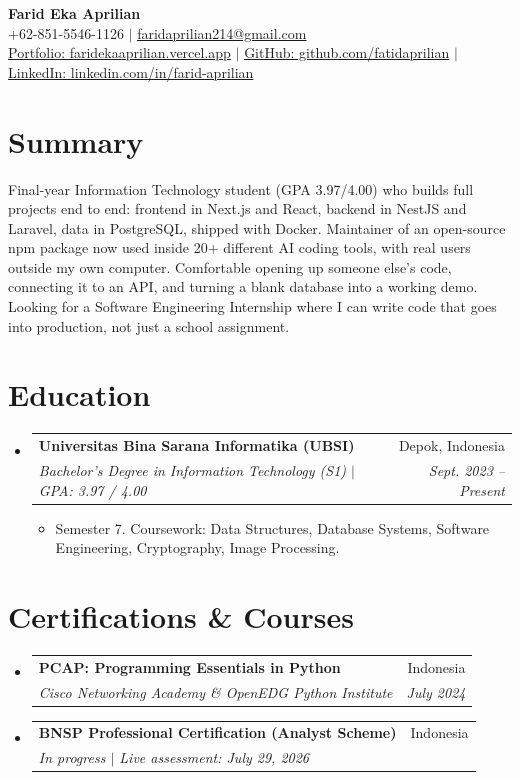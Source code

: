 \documentclass[letterpaper,11pt]{article}
\makeatletter
\newcommand{\resumeItem}[1]{
  \item\small{
    {#1 \vspace{-2pt}}
  }
}
\newcommand{\resumeSubheading}[4]{
  \vspace{-2pt}\item
    \begin{tabular*}{0.97\textwidth}[t]{l@{\extracolsep{\fill}}r}
      \textbf{#1} & #2 \\
      \textit{\small#3} & \textit{\small #4} \\
    \end{tabular*}\vspace{-5pt}
}
\newcommand{\resumeSubHeadingListStart}{\begin{itemize}[leftmargin=0.15in, label={}]}
\newcommand{\resumeSubHeadingListEnd}{\end{itemize}}
\newcommand{\resumeItemListStart}{\begin{itemize}[itemsep=0pt, topsep=0pt, parsep=2pt]}
\newcommand{\resumeItemListEnd}{\end{itemize}\vspace{1pt}}
\makeatother
\begin{document}
\begin{center}
    \textbf{\Huge Farid Eka Aprilian} \\ \vspace{4pt}
    \small +62-851-5546-1126 $|$ \href{mailto:faridaprilian214@gmail.com}{faridaprilian214@gmail.com} \\ \vspace{2pt}
    \href{https://faridekaaprilian.vercel.app/}{Portfolio: faridekaaprilian.vercel.app} $|$
    \href{https://github.com/fatidaprilian}{GitHub: github.com/fatidaprilian} $|$
    \href{https://www.linkedin.com/in/farid-aprilian/}{LinkedIn: linkedin.com/in/farid-aprilian}
\end{center}

\section{Summary}
  \small{Final-year Information Technology student (GPA 3.97/4.00) who builds full projects end to end: frontend in Next.js and React, backend in NestJS and Laravel, data in PostgreSQL, shipped with Docker. Maintainer of an open-source npm package now used inside 20+ different AI coding tools, with real users outside my own computer. Comfortable opening up someone else's code, connecting it to an API, and turning a blank database into a working demo. Looking for a Software Engineering Internship where I can write code that goes into production, not just a school assignment.}

\section{Education}
  \resumeSubHeadingListStart
    \resumeSubheading
      {Universitas Bina Sarana Informatika (UBSI)}{Depok, Indonesia}
      {Bachelor's Degree in Information Technology (S1) $|$ GPA: 3.97 / 4.00}{Sept. 2023 -- Present}
      \resumeItemListStart
        \resumeItem{Semester 7. Coursework: Data Structures, Database Systems, Software Engineering, Cryptography, Image Processing.}
      \resumeItemListEnd
  \resumeSubHeadingListEnd

\section{Certifications \& Courses}
  \resumeSubHeadingListStart
    \resumeSubheading
      {PCAP: Programming Essentials in Python}{Indonesia}
      {Cisco Networking Academy \& OpenEDG Python Institute}{July 2024}
    \resumeSubheading
      {BNSP Professional Certification (Analyst Scheme)}{Indonesia}
      {In progress $|$ Live assessment: July 29, 2026}{}
  \resumeSubHeadingListEnd
\end{document}
